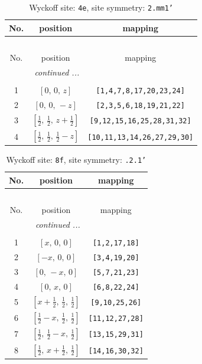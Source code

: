 \documentclass[fleqn,8pt]{jsarticle}
\begin{document}
\renewcommand{\arraystretch}{1.2}
\begin{longtable}{ccc}
\caption{Wyckoff site: {\tt 4e}, site symmetry: {\tt 2.mm1'}}
 \\
 \hline \hline
No. & position & mapping \\ \hline \endfirsthead

\multicolumn{2}{l}{\tablename\ \thetable{}} \\
 \hline \hline
No. & position & mapping \\ \hline \endhead

 \hline \hline
\multicolumn{2}{r}{\footnotesize\it continued ...} \\ \endfoot

 \hline \hline
\multicolumn{2}{r}{} \\ \endlastfoot

1 & $\left[ 0,\, 0,\, z \right]$ & {\tt [1,4,7,8,17,20,23,24]} \\ \hline
2 & $\left[ 0,\, 0,\, - z \right]$ & {\tt [2,3,5,6,18,19,21,22]} \\ \hline
3 & $\left[ \frac{1}{2},\, \frac{1}{2},\, z + \frac{1}{2} \right]$ & {\tt [9,12,15,16,25,28,31,32]} \\ \hline
4 & $\left[ \frac{1}{2},\, \frac{1}{2},\, \frac{1}{2} - z \right]$ & {\tt [10,11,13,14,26,27,29,30]} \\
\end{longtable}
\renewcommand{\arraystretch}{1.2}
\begin{longtable}{ccc}
\caption{Wyckoff site: {\tt 8f}, site symmetry: {\tt .2.1'}}
 \\
 \hline \hline
No. & position & mapping \\ \hline \endfirsthead

\multicolumn{2}{l}{\tablename\ \thetable{}} \\
 \hline \hline
No. & position & mapping \\ \hline \endhead

 \hline \hline
\multicolumn{2}{r}{\footnotesize\it continued ...} \\ \endfoot

 \hline \hline
\multicolumn{2}{r}{} \\ \endlastfoot

1 & $\left[ x,\, 0,\, 0 \right]$ & {\tt [1,2,17,18]} \\ \hline
2 & $\left[ - x,\, 0,\, 0 \right]$ & {\tt [3,4,19,20]} \\ \hline
3 & $\left[ 0,\, - x,\, 0 \right]$ & {\tt [5,7,21,23]} \\ \hline
4 & $\left[ 0,\, x,\, 0 \right]$ & {\tt [6,8,22,24]} \\ \hline
5 & $\left[ x + \frac{1}{2},\, \frac{1}{2},\, \frac{1}{2} \right]$ & {\tt [9,10,25,26]} \\ \hline
6 & $\left[ \frac{1}{2} - x,\, \frac{1}{2},\, \frac{1}{2} \right]$ & {\tt [11,12,27,28]} \\ \hline
7 & $\left[ \frac{1}{2},\, \frac{1}{2} - x,\, \frac{1}{2} \right]$ & {\tt [13,15,29,31]} \\ \hline
8 & $\left[ \frac{1}{2},\, x + \frac{1}{2},\, \frac{1}{2} \right]$ & {\tt [14,16,30,32]} \\
\end{longtable}
\end{document}
